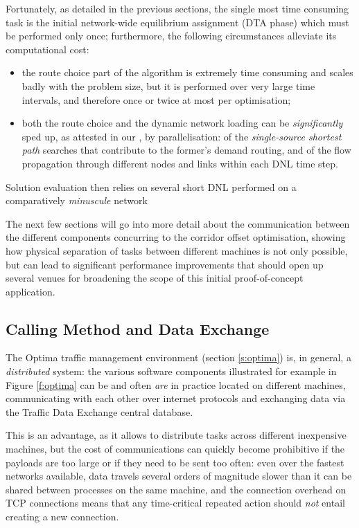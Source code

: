Fortunately, as detailed in the previous sections, the single most time consuming task is the initial network-wide equilibrium assignment (DTA phase) which must be performed only once; furthermore, the following circumstances alleviate its computational cost:
\begin{itemize}
\item the route choice part of the algorithm is extremely time consuming and scales badly with the problem size, but it is performed over very large time intervals, and therefore once or twice at most per optimisation;
\item both the route choice and the dynamic network loading can be \emph{significantly} sped up, as attested in our \citep{attanasi2015real}, by parallelisation: of the \emph{single-source shortest path} searches that contribute to the former's demand routing, and of the flow propagation through different nodes and links within each DNL time step.
\end{itemize} 

Solution evaluation then relies on several short DNL performed on a comparatively \emph{minuscule} network

The next few sections will go into more detail about the communication between the different components concurring to the corridor offset optimisation, showing how physical separation of tasks between different machines is not only possible, but can lead to significant performance improvements that should open up several venues for broadening the scope of this initial proof-of-concept application.

\subsection{Calling Method and Data Exchange}
The Optima traffic management environment (section \ref{s:optima}) is, in general, a \emph{distributed} system: the various software components illustrated for example in Figure \ref{f:optima} can be and often \emph{are} in practice located on different machines, communicating with each other over internet protocols and exchanging data via the Traffic Data Exchange central database.

This is an advantage, as it allows to distribute tasks across different inexpensive machines, but the cost of communications can quickly become prohibitive if the payloads are too large or if they need to be sent too often: even over the fastest networks available, data travels several orders of magnitude slower than it can be shared between processes on the same machine, and the connection overhead on TCP connections means that any time-critical repeated action should \emph{not} entail creating a new connection.

